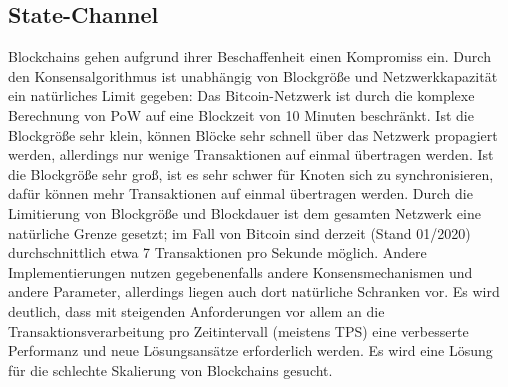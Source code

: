 \subsection{State-Channel}
\label{subsec:fundamentals:dlt:scaling}
Blockchains gehen aufgrund ihrer Beschaffenheit einen Kompromiss ein. Durch den Konsensalgorithmus ist unabhängig von Blockgröße und Netzwerkkapazität ein natürliches Limit gegeben: Das Bitcoin-Netzwerk ist durch die komplexe Berechnung von \ac{PoW} auf eine Blockzeit von 10 Minuten beschränkt. Ist die Blockgröße sehr klein, können Blöcke sehr schnell über das Netzwerk propagiert werden, allerdings nur wenige Transaktionen auf einmal übertragen werden. Ist die Blockgröße sehr groß, ist es sehr schwer für Knoten sich zu synchronisieren, dafür können mehr Transaktionen auf einmal übertragen werden. Durch die Limitierung von Blockgröße und Blockdauer ist dem gesamten Netzwerk eine natürliche Grenze gesetzt; im Fall von Bitcoin sind derzeit (Stand 01/2020) durchschnittlich etwa 7 Transaktionen pro Sekunde möglich. Andere Implementierungen nutzen gegebenenfalls andere Konsensmechanismen und andere Parameter, allerdings liegen auch dort natürliche Schranken vor. Es wird deutlich, dass mit steigenden Anforderungen vor allem an die Transaktionsverarbeitung pro Zeitintervall \cite{Macdonald2017} (meistens \ac{TPS}) eine verbesserte Performanz und neue Lösungsansätze erforderlich werden. Es wird eine Lösung für die schlechte Skalierung von Blockchains gesucht.\\
